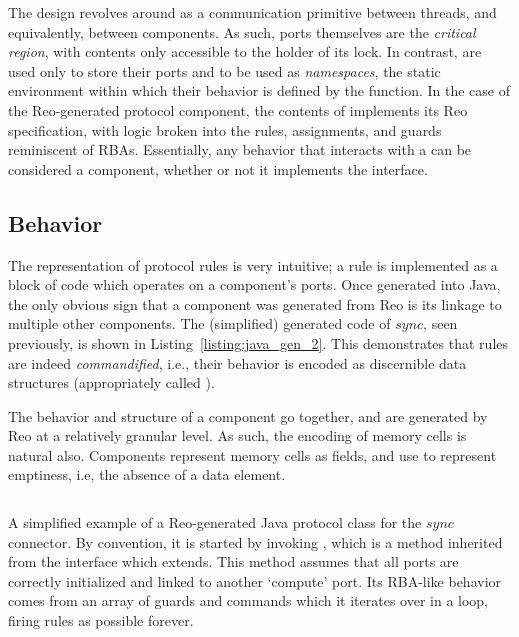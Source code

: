 The design revolves around  as a communication primitive between threads, and equivalently, between components. 
As such, ports themselves are the \textit{critical region}, with contents only accessible to the holder of its lock.
In contrast,  are used only to store their ports and to be used as \textit{namespaces}, the static environment within which their behavior is defined by the  function. In the case of the Reo-generated protocol component, the contents of  implements its Reo specification, with logic broken into the rules, assignments, and guards reminiscent of RBAs. Essentially, any behavior that interacts with a  can be considered a component, whether or not it implements the  interface.

\subsection{Behavior}
The representation of protocol rules is very intuitive; a rule is implemented as a block of code which operates on a component's ports. Once generated into Java, the only obvious sign that a component was generated from Reo is its linkage to multiple other components. The (simplified) generated  code of $sync$, seen previously, is shown in Listing~\ref{listing:java_gen_2}. This demonstrates that rules are indeed \textit{commandified}, i.e., their behavior is encoded as discernible data structures (appropriately called ).

The behavior and structure of a component go together, and are generated by Reo at a relatively granular level. As such, the encoding of memory cells is natural also. Components represent memory cells as fields, and use  to represent emptiness, i.e, the absence of a data element.

\begin{listing}[h!]
	\centering
	\inputminted{java}{java_gen_2.java}
	\caption[Reo-generated Java protocol class of the sync connector.]{A simplified example of a Reo-generated Java protocol class for the $sync$ connector. By convention, it is started by invoking , which is a method inherited from the  interface which  extends. This method assumes that all ports are correctly initialized and linked to another `compute' port. Its RBA-like behavior comes from an array of guards and commands which it iterates over in a loop, firing rules as possible forever.}
	\label{listing:java_gen_2}
\end{listing}


